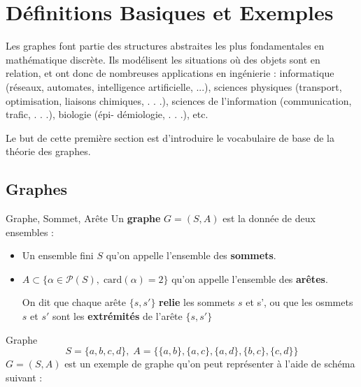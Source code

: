 \chapter{Définitions Basiques et Exemples}

Les graphes font partie des structures abstraites les plus fondamentales en mathématique discrète. Ils modélisent les situations où des objets sont en relation, et ont donc de nombreuses applications en ingénierie : informatique (réseaux, automates, intelligence artificielle, ...), sciences physiques (transport, optimisation, liaisons chimiques, . . .), sciences de l’information (communication, trafic, . . .), biologie (épi- démiologie, . . .), etc.

Le but de cette première section est d’introduire le vocabulaire de base de la théorie des graphes.
\section{Graphes}

\begin{Definition}[colbacktitle=red!75!black]{Graphe, Sommet, Arête}{}
Un \textbf{graphe} $G = (S,A)$ est la donnée de deux ensembles :
\begin{itemize}
    \item Un ensemble fini $S$ qu'on appelle l'ensemble des \textbf{sommets}.
    \item $A \subset  \{ \alpha \in \mathcal{P} (S),\; \mathrm{card} (\alpha)=2 \}$ qu'on appelle l'ensemble des \textbf{arêtes}.

        On dit que chaque arête $\{s, s'\}$  \textbf{relie} les sommets $s$ et s', ou que les osmmets $s$ et $s'$ sont les  \textbf{extrémités} de l'arête $\{s, s'\}$
\end{itemize}
\end{Definition}
\begin{Example}{Graphe}{}
\[
    S = \{a,b,c,d\},\; A = \{\{a,b\}, \{a,c\}, \{a,d\},\{b,c\}, \{c,d\}\}
\]
$G = (S,A)$ est un exemple de graphe qu'on peut représenter à l'aide de schéma suivant : 

\begin{center}
\end{center}
\end{Example}

